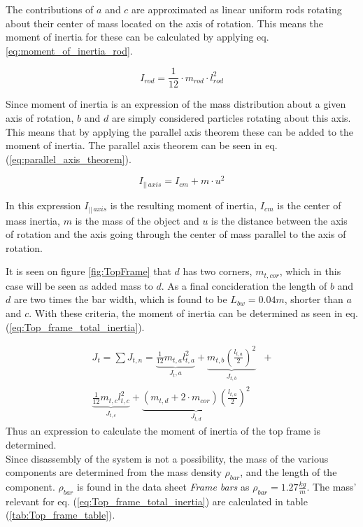 \documentclass[../../main]{subfiles}
\begin{document}
The contributions of $a$ and $c$ are approximated as linear uniform rods rotating about their center of mass located on the axis of rotation. This means the moment of inertia for these can be calculated by applying eq. \ref{eq:moment_of_inertia_rod}.

\begin{equation}
  \label{eq:moment_of_inertia_rod}
  I_{rod}=\frac{1}{12}\cdot m_{rod} \cdot l_{rod}^2
\end{equation}

Since moment of inertia is an expression of the mass distribution about a given axis of rotation, $b$ and $d$ are simply considered particles rotating about this axis. This means that by applying the parallel axis theorem these can be added to the moment of inertia. The parallel axis theorem can be seen in eq. (\ref{eq:parallel_axis_theorem}).

\begin{equation}
  \label{eq:parallel_axis_theorem}
  I_{||\,axis} = I_{cm} + m\cdot u^2
\end{equation}

In this expression $I_{||\,axis}$ is the resulting moment of inertia, $I_{cm}$ is the center of mass inertia, $m$ is the mass of the object and $u$ is the distance between the axis of rotation and the axis going through the center of mass parallel to the axis of rotation.

It is seen on figure \ref{fig:TopFrame} that $d$ has two corners, $m_{t,cor}$, which in this case will be seen as added mass to $d$. As a final concideration the length of $b$ and $d$ are two times the bar width, which is found to be $L_{bw} = 0.04m$, shorter than $a$ and $c$. With these criteria, the moment of inertia can be determined as seen in eq. (\ref{eq:Top_frame_total_inertia}).

\begin{equation}
  \label{eq:Top_frame_total_inertia}
\begin{split}
  J_t = \sum J_{t,n} =
  \underbrace{\frac{1}{12}m_{t,a}l_{t,a}^2}_\text{$J_t,a$} +
  \underbrace{m_{t,b}\left(\frac{l_{t,a}}{2}\right)^2}_\text{$J_{t,b}$} &+ \\
  \underbrace{ \frac{1}{12} m_{t,c}l_{t,c}^2}_\text{$J_{t,c}$} +
  \underbrace{(m_{t,d} + 2\cdot m_{cor})\left(\frac{l_{t,a}}{2}\right)^2}_\text{$J_{t,d}$}
\end{split}
\end{equation}
Thus an expression to calculate the moment of inertia of the top frame is determined.\\
Since disassembly of the system is not a possibility, the mass of the various components are determined from the mass density $\rho_{bar}$, and the length of the component. $\rho_{bar}$ is found in the data sheet \textit{Frame bars} as $\rho_{bar} = 1.27 \si{\frac{kg}{m}}$. The mass' relevant for eq. (\ref{eq:Top_frame_total_inertia}) are calculated in table (\ref{tab:Top_frame_table}).
\end{document}
